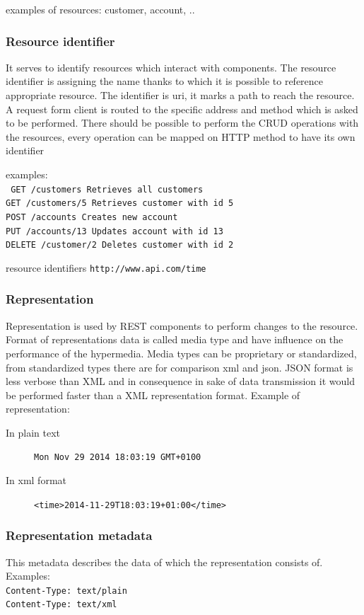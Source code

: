   examples of resources: customer, account, ..

\subsubsection{Resource identifier}
  It serves to identify resources which interact with components. The resource identifier is assigning the name thanks to which it is possible to reference appropriate resource. The identifier is \gls{uri}, it marks a path to reach the resource. A request form client is routed to the specific address and method which is asked to be performed. 
There should be possible to perform the \gls{CRUD} operations with the resources, every operation can be mapped on HTTP method to have its own identifier

examples: \\
\texttt{
GET     /customers      Retrieves all customers \\
GET     /customers/5    Retrieves customer with id 5 \\
POST    /accounts       Creates new account \\
PUT     /accounts/13    Updates account with id 13 \\
DELETE  /customer/2     Deletes customer with id 2 \\
}
 
  resource identifiers 
  \texttt{http://www.api.com/time}
\subsubsection{Representation}
  Representation is used by REST components to perform changes to the resource. Format of representations data is called media type and have influence on the performance of the hypermedia. Media types can be proprietary or standardized, from standardized types there are for comparison \gls{xml} and \gls{json}. JSON format is less verbose than XML and in consequence in sake of data transmission it would be performed faster than a XML representation format.
  Example of representation:
  \begin{description}
    \item[In plain text] \texttt{Mon Nov 29 2014 18:03:19 GMT+0100}
    \item[In xml format] \texttt{<time>2014-11-29T18:03:19+01:00</time>}
  \end{description}

\subsubsection{Representation metadata}
  This metadata describes the data of which the representation consists of.
  Examples: \hfill \\
  \texttt{Content-Type: text/plain} \hfill \\
  \texttt{Content-Type: text/xml}
  
